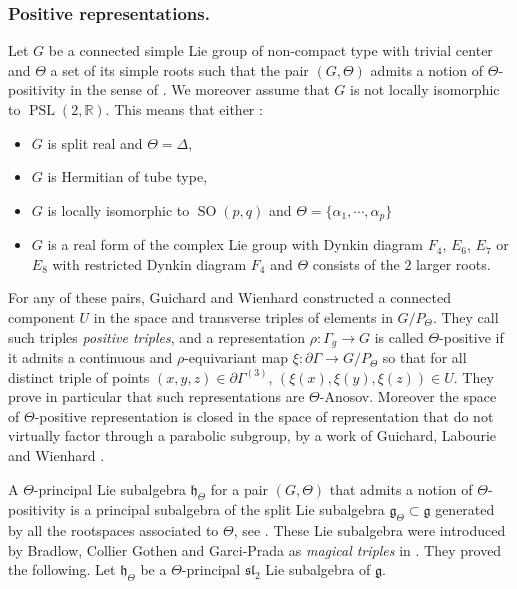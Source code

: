 \documentclass[reqno,10pt]{amsart}
\theoremstyle{plain}
\theoremstyle{definition}
\theoremstyle{remark}
\newcommand{\R}{\mathbb{R}}
\DeclareMathOperator{\PSL}{PSL}
\DeclareMathOperator{\SO}{SO}
\begin{document}
\subsubsection{Positive representations.}

Let $G$ be a connected simple Lie group of non-compact type with trivial center and $\Theta$ a set of its simple roots such that the pair $(G,\Theta)$ admits a notion of $\Theta$-positivity in the sense of \cite{GWpositivity22}. We moreover assume that $G$ is not locally isomorphic to $\PSL(2,\R)$. This means that either :
\begin{itemize}
\item[(i)] $G$ is split real and $\Theta=\Delta$,
\item[(ii)] $G$ is Hermitian of tube type,
\item[(iii)] $G$ is locally isomorphic to $\SO(p,q)$ and $\Theta=\lbrace\alpha_1,\cdots, \alpha_p\rbrace$
\item[(iv)] $G$ is a real form of the complex Lie group with Dynkin diagram $F_4$, $E_6$, $E_7$ or $E_8$ with restricted Dynkin diagram $F_4$ and $\Theta$ consists of the $2$ larger roots.
\end{itemize}

For any of these pairs, Guichard and Wienhard \cite{GWpositivity22} constructed a connected component $U$ in the space and transverse triples of elements in $G/P_\Theta$. They call such triples \emph{positive triples}, and a representation $\rho:\Gamma_g\to G$ is called $\Theta$-positive if it admits a continuous and $\rho$-equivariant map $\xi:\partial\Gamma\to G/P_\Theta$ so that for all distinct triple of points $(x,y,z)\in \partial\Gamma^{(3)}$, $(\xi(x),\xi(y),\xi(z))\in U$. They prove in particular that such representations are $\Theta$-Anosov. Moreover the space of $\Theta$-positive representation is closed in the space of representation that do not virtually factor through a parabolic subgroup, by a work of Guichard, Labourie and Wienhard \cite{positivityLabourie}.

\medskip

A $\Theta$-principal Lie subalgebra $\mathfrak{h}_\Theta$ for a pair $(G,\Theta)$ that admits a notion of $\Theta$-positivity is a principal subalgebra of the split Lie subalgebra $\mathfrak{g}_\Theta\subset \mathfrak{g}$ generated by all the rootspaces associated to $\Theta$, see \cite{GWpositivity22}. These Lie subalgebra were introduced by Bradlow, Collier Gothen and Garci-Prada as \emph{magical triples} in \cite{magical}. They proved the following. Let $\mathfrak{h}_\Theta$ be a $\Theta$-principal $\mathfrak{sl}_2$ Lie subalgebra of $\mathfrak{g}$.
\end{document}

